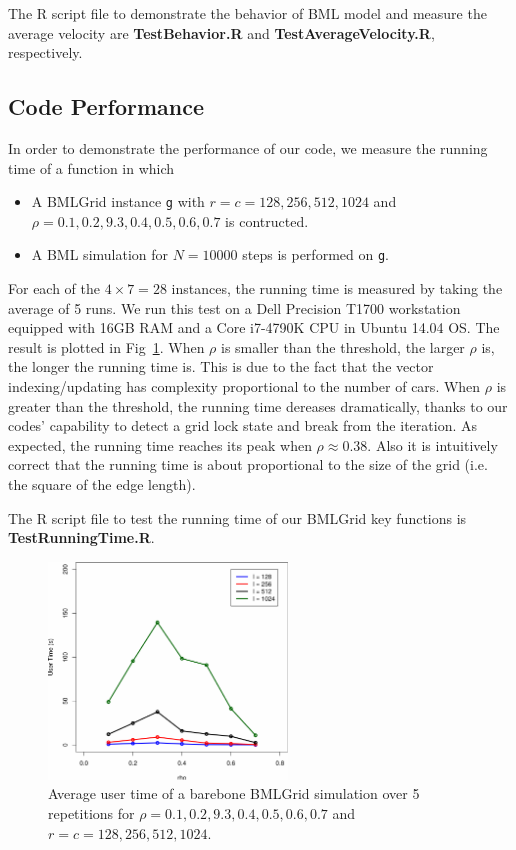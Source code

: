 \documentclass[twocolumn]{article}
\begin{document}
The R script file to demonstrate the behavior of BML model and measure the
average velocity are \textbf{TestBehavior.R} and
\textbf{TestAverageVelocity.R}, respectively.

\subsection{Code Performance}
In order to demonstrate the performance of our code, we measure the running time
of a function in which
\begin{itemize}
    \item A BMLGrid instance \texttt{g} with $r=c=128,256,512,1024$ and
    $\rho=0.1,0.2,9.3,0.4,0.5,0.6,0.7$ is contructed.
    \item A BML simulation for $N=10000$ steps is performed on \texttt{g}.
\end{itemize}
For each of the $4\times7 = 28$ instances, the running time is measured by
taking the average of 5 runs. We run this test on a Dell Precision T1700
workstation equipped with 16GB RAM and a Core i7-4790K CPU in Ubuntu 14.04 OS.
The result is plotted in Fig~\ref{fig:running_time}. When $\rho$ is smaller than
the threshold, the larger $\rho$ is, the longer the running time is. This is due
to the fact that the vector indexing/updating has complexity proportional to the
number of cars. When $\rho$ is greater than the threshold, the running time
dereases dramatically, thanks to our codes' capability to detect a grid lock
state and break from the iteration. As expected, the running time reaches its
peak when $\rho\approx0.38$. Also it is intuitively correct that the running
time is about proportional to the size of the grid (i.e. the square of the edge
length).

The R script file to test the running time of our BMLGrid key functions is
\textbf{TestRunningTime.R}.

\begin{figure}[h]
    \centering
    \includegraphics[width=2.5in]{figs/TestRunningTime.pdf}
    \caption{Average user time of a barebone BMLGrid simulation over 5
    repetitions for $\rho=0.1,0.2,9.3,0.4,0.5,0.6,0.7$ and
    $r=c=128,256,512,1024$.}
    \label{fig:running_time}
\end{figure}
\end{document}
